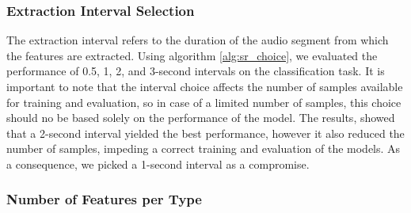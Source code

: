 \subsubsection{Extraction Interval Selection}  %
\label{sec:extraction_interval}
The extraction interval refers to the duration of the audio segment from which the features are extracted.
Using algorithm \ref{alg:sr_choice}, we evaluated the performance of 0.5, 1, 2, and 3-second intervals
on the classification task. It is important to note that the interval choice affects the number of samples 
available for training and evaluation, so in case of a limited number of samples, this choice should no be based
solely on the performance of the model. The results, showed that a 2-second interval yielded the best performance, 
however it also reduced the number of samples, impeding a correct training and evaluation of the models. 
As a consequence, we picked a 1-second interval as a compromise.

\subsubsection{Number of Features per Type} %